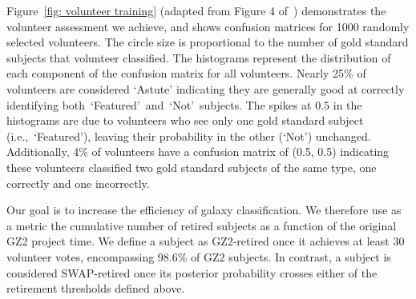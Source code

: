 \documentclass[twocolumn]{aastex6}
\newcommand{\Pf}{$P_{F,0}$}
\newcommand{\Pn}{$P_{N,0}$}
\newcommand{\p}{$p_0$}
\newcommand{\tf}{$t_F$}
\newcommand{\tn}{$t_N$}
\newcommand{\feat}{`Featured'}
\newcommand{\notfeat}{`Not'}
\begin{document}
Figure~\ref{fig: volunteer training} (adapted from Figure 4 of~\citealt{Marshall2016})
demonstrates the volunteer assessment we achieve, and shows confusion matrices 
 for 1000 randomly selected volunteers. The circle size is proportional to the number of 
gold standard subjects that volunteer classified. 
The histograms represent the distribution of each component
of the confusion matrix for all volunteers.
 Nearly 25\% of volunteers are considered `Astute'  indicating
they are generally good at correctly identifying both~\feat~and~\notfeat~subjects.
The spikes at $0.5$ in the histograms are due to volunteers who see only one 
gold standard subject (i.e.,~\feat), leaving their probability in the 
other (\notfeat) unchanged.
Additionally, 4\% of volunteers have a confusion matrix of (0.5, 0.5) indicating these 
volunteers classified two gold standard subjects of the same type, one correctly and 
one incorrectly. 

Our goal is to increase the efficiency of galaxy classification. We therefore
 use as a metric the cumulative number of retired subjects
as a function of the original GZ2 project time.
We define a subject as GZ2-retired once it achieves at least 30 volunteer votes, 
encompassing 98.6\% of GZ2 subjects.
In contrast, a subject is considered SWAP-retired once its posterior 
probability crosses either of the retirement thresholds defined above. 
\end{document}
